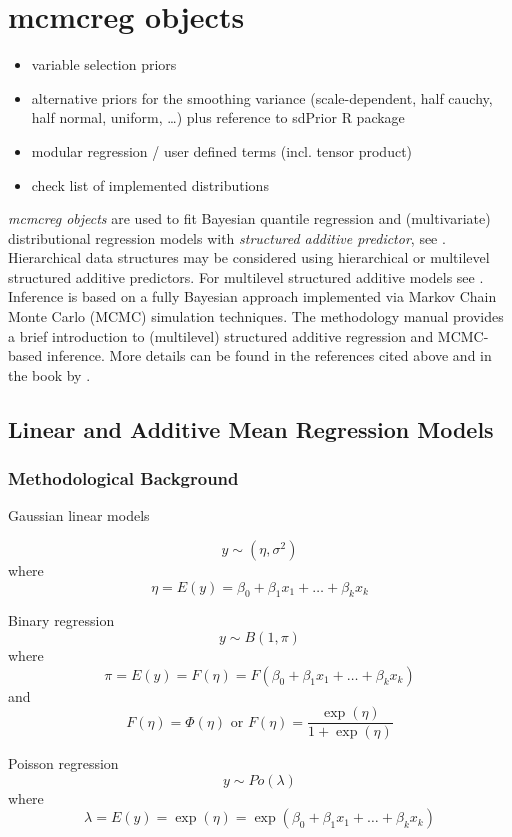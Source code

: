 \chapter{mcmcreg objects}
\label{mcmcreg} 

\begin{itemize}
 \item variable selection priors
 \item alternative priors for the smoothing variance (scale-dependent, half cauchy, half normal, uniform, \ldots) plus reference to sdPrior R package
 \item modular regression / user defined terms (incl. tensor product)
 \item check list of implemented distributions
\end{itemize}

{\em mcmcreg objects} are used to fit Bayesian quantile regression and (multivariate) distributional regression models with {\em
structured additive predictor}, see . Hierarchical data structures may be considered using
hierarchical or multilevel structured additive predictors. For multilevel structured additive models  see
. Inference is based on a fully Bayesian approach implemented via Markov Chain Monte Carlo (MCMC)
simulation techniques. The methodology manual provides a brief introduction to (multilevel) structured additive regression and MCMC-based
inference. More details can be found in the references cited above and in the book by .

\section{Linear and Additive Mean Regression Models}

\subsection{Methodological Background}

Gaussian linear models

$$
y \sim (\eta,\sigma^2)  
$$
where
$$
 \eta = E(y) = \beta_0 + \beta_1 x_1 + \ldots + \beta_k x_k
$$

Binary regression
$$
y \sim B(1,\pi)
$$
where
$$
\pi = E(y) = F(\eta) = F(\beta_0 + \beta_1 x_1 + \ldots + \beta_k x_k)
$$
and 
$$
F(\eta) = \Phi(\eta) \mbox{ or } F(\eta) = \frac{\exp(\eta)}{1+\exp(\eta)} 
$$

Poisson regression
$$
y \sim Po(\lambda)
$$
where
$$
\lambda = E(y) = \exp(\eta) = \exp(\beta_0 + \beta_1 x_1 + \ldots + \beta_k x_k)
$$

